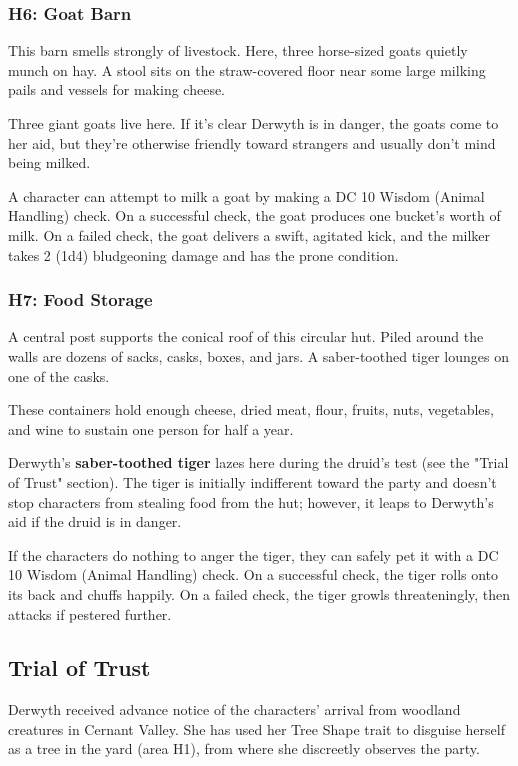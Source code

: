 \documentclass[10pt,a4paper,twoside,bg=print,twocolumn,openany,nodeprecatedcode]{dndbook}
\begin{document}
\subsubsection{H6: Goat Barn}
\begin{DndReadAloud}{}
This barn smells strongly of livestock. Here, three horse-sized goats quietly munch on hay. A stool sits on the straw-covered floor near some large milking pails and vessels for making cheese.

\end{DndReadAloud}

Three giant goats live here. If it's clear Derwyth is in danger, the goats come to her aid, but they're otherwise friendly toward strangers and usually don't mind being milked.

A character can attempt to milk a goat by making a DC 10 Wisdom (Animal Handling) check. On a successful check, the goat produces one bucket's worth of milk. On a failed check, the goat delivers a swift, agitated kick, and the milker takes 2 (1d4) bludgeoning damage and has the prone condition.

\subsubsection{H7: Food Storage}
\begin{DndReadAloud}{}
A central post supports the conical roof of this circular hut. Piled around the walls are dozens of sacks, casks, boxes, and jars. A saber-toothed tiger lounges on one of the casks.

\end{DndReadAloud}

These containers hold enough cheese, dried meat, flour, fruits, nuts, vegetables, and wine to sustain one person for half a year.

Derwyth's \textbf{saber-toothed tiger} lazes here during the druid's test (see the "Trial of Trust" section). The tiger is initially indifferent toward the party and doesn't stop characters from stealing food from the hut; however, it leaps to Derwyth's aid if the druid is in danger.

If the characters do nothing to anger the tiger, they can safely pet it with a DC 10 Wisdom (Animal Handling) check. On a successful check, the tiger rolls onto its back and chuffs happily. On a failed check, the tiger growls threateningly, then attacks if pestered further.

\subsection{Trial of Trust}
Derwyth received advance notice of the characters' arrival from woodland creatures in Cernant Valley. She has used her Tree Shape trait to disguise herself as a tree in the yard (area H1), from where she discreetly observes the party.
\end{document}
